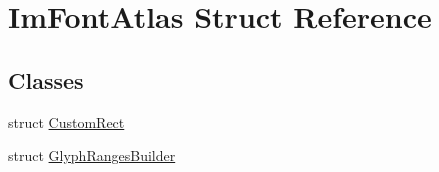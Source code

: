 \hypertarget{struct_im_font_atlas}{}\section{Im\+Font\+Atlas Struct Reference}
\label{struct_im_font_atlas}
\subsection*{Classes}
\begin{DoxyCompactItemize}
\item 
struct \hyperlink{struct_im_font_atlas_1_1_custom_rect}{Custom\+Rect}
\item 
struct \hyperlink{struct_im_font_atlas_1_1_glyph_ranges_builder}{Glyph\+Ranges\+Builder}
\end{DoxyCompactItemize}
